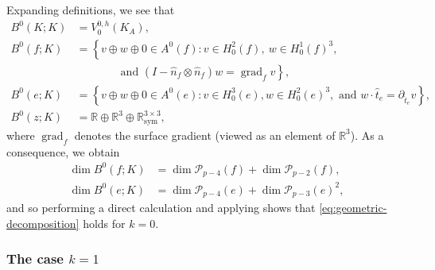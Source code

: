 \documentclass{mcom-l}
\theoremstyle{definition}
\theoremstyle{remark}
\numberwithin{equation}{section}
\newcommand{\unitvec}[1]{\hat{#1}}
\DeclareMathOperator{\grad}{grad}
\DeclareMathOperator{\sym}{sym}
\begin{document}
Expanding definitions, we see that
\begin{align*}
	B^0(K; K) &= V_0^{0, h}(K_A), \\
	B^0(f; K) &= \left\{ v \oplus w 
	\oplus 0 \in A^0(f) : 
	v \in H^2_0(f), \ w \in H^1_0(f)^3, 
	\right. 
	\\
	&\qquad \qquad 
	\left. 
	\text{and }
	(I - \unitvec{n}_f \otimes \unitvec{n}_f) w 
	= \grad_f v 
	\right\}, \\
	B^0(e; K) &= \left\{ v \oplus w 
	\oplus 0 \in A^0(e) : 
	v \in H^3_0(e), w \in H^2_0(e)^3, \text{ and }
	w \cdot \unitvec{t}_e = \partial_{\unitvec{t}_e} v 
	\right\}, \\
	B^0(z; K) &= \mathbb{R} \oplus \mathbb{R}^3 
	\oplus \mathbb{R}_{\sym}^{3 \times 3},
\end{align*}
where $\grad_f$ denotes the surface gradient 
(viewed as an element of $\mathbb{R}^3$).
As a consequence, we obtain
\begin{align*}
	\dim B^0(f; K) &= \dim \mathcal{P}_{p-4}(f) + \dim \mathcal{P}_{p-2}(f), \\
	\dim B^0(e; K) &= \dim \mathcal{P}_{p-4}(e) + \dim \mathcal{P}_{p-3}(e)^2,
\end{align*}
and so performing a direct calculation 
and applying \cite[Lemma 4.8]{FuGuzmanNeilan20}
shows that \cref{eq:geometric-decomposition} holds for $k=0$.

\subsubsection{The case $k=1$}
\end{document}
